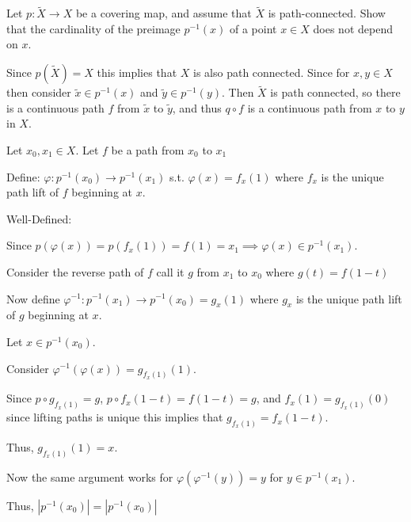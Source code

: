 \documentclass[12pt, letterpaper]{article}
\begin{document}
\begin{problem}{}
    Let $p:\widetilde{X} \to X$ be a covering map, and assume that
  $\widetilde{X}$ is path-connected. Show that the cardinality of the
  preimage $p^{-1}(x)$ of a point $x \in X$ does not depend on
  $x$.
\end{problem}
\begin{problemproof}
    Since $p(\widetilde{X})=X$ this implies that $X$ is also path connected. Since for $x,y \in X$ then consider $\widetilde{x} \in p^{-1}(x)$ and $\widetilde{y} \in p^{-1}(y)$. Then $\widetilde{X}$ is path connected, so there is a continuous path $f$ from $\widetilde{x}$ to $\widetilde{y}$, and thus $q \circ f$ is a continuous path from $x$ to $y$ in $X$.

    Let $x_0,x_1 \in X$. Let $f$ be a path from $x_0$ to $x_1$

    Define: $\varphi : p^{-1}(x_0) \to p^{-1}(x_1)$ s.t. $\varphi(x)=f_x(1)$ where $f_x$ is the unique path lift of $f$ beginning at $x$.

    Well-Defined:

    Since $p(\varphi(x))=p(f_x(1))=f(1)=x_1 \implies \varphi(x) \in p^{-1}(x_1)$.

    Consider the reverse path of $f$ call it $g$ from $x_1$ to $x_0$ where $g(t)=f(1-t)$

    Now define $\varphi^{-1} : p^{-1}(x_1) \to p^{-1}(x_0)=g_x(1)$ where $g_x$ is the unique path lift of $g$ beginning at $x$.

    Let $x \in p^{-1}(x_0)$.

    Consider $\varphi^{-1}(\varphi(x))=g_{f_x(1)}(1)$.

    Since $p \circ g_{f_x(1)}=g$, $p \circ f_x(1-t)=f(1-t)=g$, and $f_x(1)=g_{f_x(1)}(0)$ since lifting paths is unique this implies that $g_{f_x(1)}=f_x(1-t)$.

    Thus, $g_{f_x(1)}(1)=x$.

    Now the same argument works for $\varphi(\varphi^{-1}(y))=y$ for $y \in p^{-1}(x_1)$.

    Thus, $|p^{-1}(x_0)|=|p^{-1}(x_0)|$
\end{problemproof}
\end{document}
